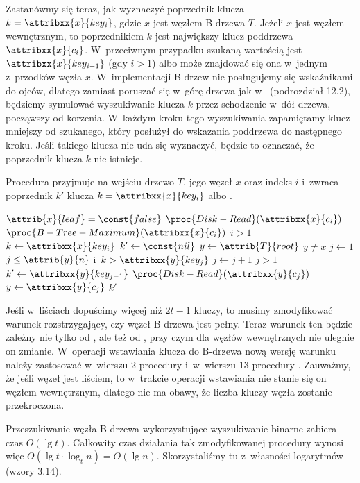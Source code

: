 Zastanówmy się teraz, jak wyznaczyć poprzednik klucza $k=\attribxx{x}{key_i}$, gdzie $x$ jest węzłem B-drzewa $T$.
Jeżeli $x$ jest węzłem wewnętrznym, to poprzednikiem $k$ jest największy klucz poddrzewa $\attribxx{x}{c_i}$.
W~przeciwnym przypadku szukaną wartością jest $\attribxx{x}{key_{i-1}}$ (gdy $i>1$) albo może znajdować się ona w~jednym z~przodków węzła $x$.
W~implementacji B-drzew nie posługujemy się wskaźnikami do ojców, dlatego zamiast poruszać się w~górę drzewa jak w~ (podrozdział 12.2), będziemy symulować wyszukiwanie klucza $k$ przez schodzenie w~dół drzewa, począwszy od korzenia.
W~każdym kroku tego wyszukiwania zapamiętamy klucz mniejszy od szukanego, który posłużył do wskazania poddrzewa do następnego kroku.
Jeśli takiego klucza nie uda się wyznaczyć, będzie to oznaczać, że poprzednik klucza $k$ nie istnieje.

Procedura przyjmuje na wejściu drzewo $T$, jego węzeł $x$ oraz indeks $i$ i~zwraca poprzednik $k'$ klucza $k=\attribxx{x}{key_i}$ albo .
\begin{codebox}
\li \If $\attrib{x}{leaf}=\const{false}$
\li   \Then $\proc{Disk-Read}(\attribxx{x}{c_i})$
\li     \Return $\proc{B-Tree-Maximum}(\attribxx{x}{c_i})$
    \End
\li \If $i>1$
\li   \Then \Return {}
    \End
\li $k\gets\attribxx{x}{key_i}$
\li $k'\gets\const{nil}$
\li $y\gets\attrib{T}{root}$
\li \While $y\ne x$
\li   \Do $j\gets1$
\li   \While $j\le\attrib{y}{n}$ i~$k>\attribxx{y}{key_j}$
\li     \Do $j\gets j+1$
      \End
\li   \If $j>1$
\li     \Then $k'\gets\attribxx{y}{key_{j-1}}$
      \End
\li   $\proc{Disk-Read}(\attribxx{y}{c_j})$
\li   $y\gets\attribxx{y}{c_j}$
    \End
\li \Return $k'$
\end{codebox}

\exercise %
\exercise %
Jeśli w~liściach dopuścimy więcej niż $2t-1$ kluczy, to musimy zmodyfikować warunek rozstrzygający, czy węzeł B-drzewa jest pełny.
Teraz warunek ten będzie zależny nie tylko od , ale też od , przy czym dla węzłów wewnętrznych nie ulegnie on zmianie.
W~operacji wstawiania klucza do B-drzewa nową wersję warunku należy zastosować w~wierszu 2 procedury  i~w~wierszu 13 procedury .
Zauważmy, że jeśli węzeł jest liściem, to w~trakcie operacji wstawiania nie stanie się on węzłem wewnętrznym, dlatego nie ma obawy, że liczba kluczy węzła zostanie przekroczona.

\exercise %
Przeszukiwanie węzła B-drzewa wykorzystujące wyszukiwanie binarne zabiera czas $O(\lg t)$.
Całkowity czas działania tak zmodyfikowanej procedury  wynosi więc $O(\lg t\cdot\log_tn)=O(\lg n)$.
Skorzystaliśmy tu z~własności logarytmów (wzory 3.14).

